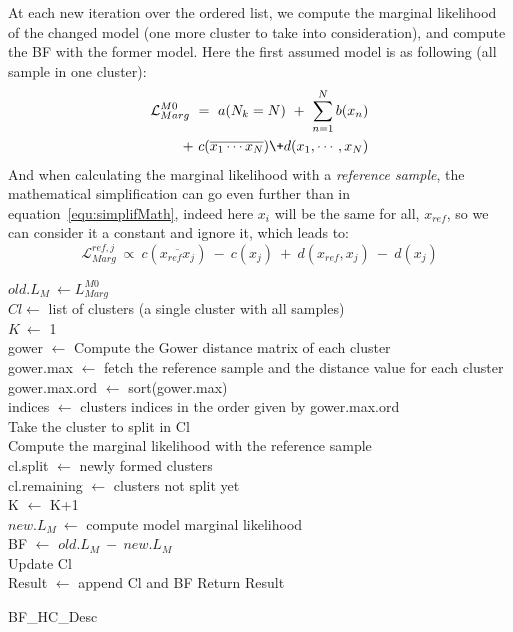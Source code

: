 \documentclass[twocolumn]{article}
\begin{document}
At each new iteration over the ordered list, we compute the marginal likelihood of the changed model (one more cluster to take into consideration), and compute the BF with the former model.
Here the first assumed model is as following (all sample in one cluster):
\begin{align}
    \mathcal{L}_{Marg}^{M0}\ =\ a(N_k=N)\ +\ \sum_{n=1}^Nb(x_n)\nonumber\\ 
    +\ c(\overline{x_1\cdots x_N})\+d(x_1,\cdots,x_N)
\end{align}
And when calculating the marginal likelihood with a \emph{reference sample}, the mathematical simplification can go even further than in equation~\ref{equ:simplifMath}, indeed here $x_i$ will be the same for all, $x_{ref}$, so we can consider it a constant and ignore it, which leads to:
\begin{equation}
    \mathcal{L}_{Marg}^{ref,j}\ \propto\ c(\overline{x_{ref}x_j})\ -\ c(x_j)\ +\ d(x_{ref},x_j)\ -\ d(x_j)
\end{equation}
\begin{algorithm}[!]
 \BlankLine
 $old.L_M\ \leftarrow L_{Marg}^{M0}$\\
 $Cl \leftarrow$ list of clusters (a single cluster with all samples)\\
 $K\ \leftarrow$ 1\\
 \BlankLine
    {
        gower $\leftarrow$ Compute the Gower distance matrix of each cluster\\
        gower.max $\leftarrow$ fetch the reference sample and the distance value for each cluster\\
        gower.max.ord $\leftarrow$ sort(gower.max)\\
        indices $\leftarrow$ clusters indices in the order given by gower.max.ord\\
        {
            Take the cluster to split in Cl\\
            Compute the marginal likelihood with the reference sample\\
            cl.split $\leftarrow$ newly formed clusters\\
            cl.remaining $\leftarrow$ clusters not split yet\\
            K $\leftarrow$ K+1\\
            $new.L_M\ \leftarrow$ compute model marginal likelihood\\
            BF $\leftarrow$ $old.L_M\ -\ new.L_M$\\
            Update Cl\\
            Result $\leftarrow$ append Cl and BF
        }
    }
    Return Result
 \caption{BF\_HC\_Desc}
\end{algorithm}
\end{document}

